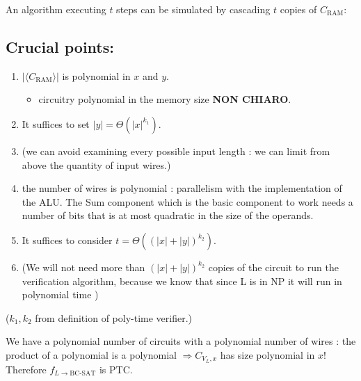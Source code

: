 An algorithm executing $t$ steps can be simulated by cascading $t$ copies of $C_{\mathrm{RAM}}$:

\subsection{Crucial points:}
\begin{enumerate}
\item $|\langle C_{\mathrm{RAM}}\rangle|$ is polynomial in $x$ and $y$.
\begin{itemize}\item circuitry polynomial in the memory size \textbf{NON CHIARO}.\end{itemize}
\item It suffices to set $|y|=\Theta(|x|^{k_1})$. 
\item(we can avoid examining every possible input length : we can limit from above the quantity of input wires.)
\item the number of wires is polynomial : parallelism with the implementation of the ALU. The Sum component which is  the basic component to work needs a number of bits that is at most quadratic in the size of the operands. 
\item It suffices to consider $t=\Theta((|x|+|y|)^{k_2})$. 
\item (We will not need more than $(|x|+|y|)^{k_2}$ copies of the circuit to run the verification algorithm, because we know that since L is in NP it will run in polynomial time )
\end{enumerate}
($k_1,k_2$ from definition of poly-time verifier.)

We have a polynomial number of circuits with a polynomial number of wires : the product of a polynomial is a polynomial $\Rightarrow C_{V_L,x}$ has size polynomial in $x$!
Therefore $f_{L\to\mathrm{BC\text{-}SAT}}$ is PTC.
